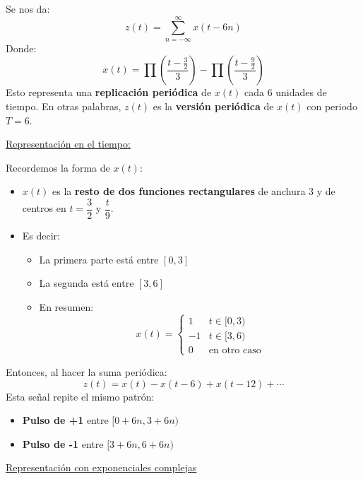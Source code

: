 \begin{enumerate}[label=\color{red}\textbf{\alph*)}]
        Se nos da: \[
        z(t)=\sum_{n=-\infty}^{\infty} x(t-6n)
        \] 
        Donde: \[
        x(t)=\prod\left( \dfrac{t-\frac{3}{2} }{3} \right) -\prod\left( \dfrac{t-\frac{9}{2} }{3} \right) 
        \] 
        Esto representa una \textbf{replicación periódica} de $x(t)$ cada 6 unidades de tiempo. En otras palabras, $z(t)$ es la  \textbf{versión periódica} de $x(t)$ con periodo $T=6$.

         \underline{Representación en el tiempo:}

         Recordemos la forma de $x(t)$:
          \begin{itemize}[label=\textbullet]
             \item $x(t)$ es la  \textbf{resto de dos funciones rectangulares} de anchura 3 y de centros en $t=\dfrac{3}{2}$ y $\dfrac{t}{9}$.
             \item Es decir:
                 \begin{itemize}[label=\textbullet]
                     \item La primera parte está entre $[0,3]$
                     \item La segunda está entre  $[3,6]$
                     \item En resumen:  \[
                     x(t)=\begin{cases}
                         1 & t\in [0,3)\\
                         -1 & t\in [3,6)\\
                         0 & \text{en otro caso}
                     \end{cases}
                     \] 
                 \end{itemize}
         \end{itemize}
         Entonces, al hacer la suma periódica: \[
         z(t)=x(t)-x(t-6)+x(t-12)+\cdots
         \] 
         Esta señal repite el mismo patrón:
         \begin{itemize}[label=\textbullet]
             \item \textbf{Pulso de +1} entre $[0+6n,3+6n)$ 
             \item \textbf{Pulso de -1} entre $[3+6n,6+6n)$ 
         \end{itemize}
         \underline{Representación con exponenciales complejas}


\end{enumerate}
